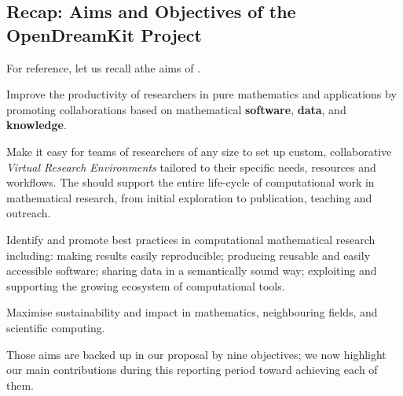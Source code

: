 \subsection{Recap: Aims and Objectives of the OpenDreamKit Project}
For reference, let us recall athe aims of \ODK.
\begin{compactenum}[\bf {A}1\rm:]
\item \label{aim:collaboration} Improve the productivity of
  researchers in pure mathematics and applications by promoting
  collaborations based on mathematical \textbf{software},
  \textbf{data}, and \textbf{knowledge}.
\item \label{aim:vre} Make it easy for teams of researchers of any
  size to set up custom, collaborative \emph{Virtual Research
    Environments} tailored to their specific needs, resources and
  workflows. The \VREs should support the entire life-cycle of
  computational work in mathematical research, from initial
  exploration to publication, teaching and outreach.
\item \label{aim:sharing} Identify and promote best practices in
  computational mathematical research including: making results easily
  reproducible; producing reusable and easily accessible
  software; sharing data in a semantically sound way; exploiting and
  supporting the growing ecosystem of computational tools.
\item \label{aim:impact} Maximise sustainability and impact in
  mathematics, neighbouring fields, and scientific computing.
\end{compactenum}

Those aims are backed up in our proposal by nine objectives; we now
highlight our main contributions during this reporting period toward
achieving each of them.

